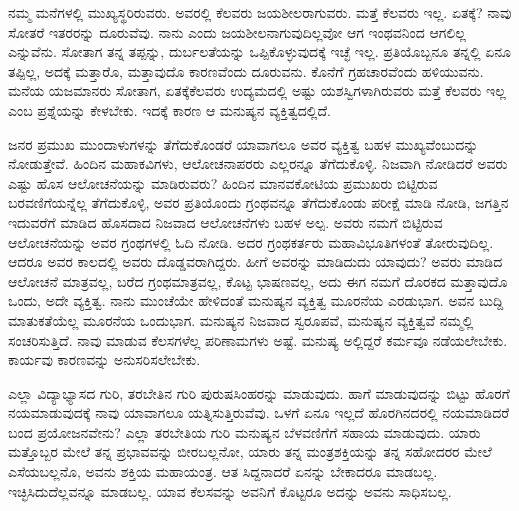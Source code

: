 ನಮ್ಮ ಮನೆಗಳಲ್ಲಿ ಮುಖ್ಯಸ್ಥರಿರುವರು. ಅವರಲ್ಲಿ ಕೆಲವರು ಜಯಶೀಲರಾಗುವರು. ಮತ್ತೆ ಕೆಲವರು ಇಲ್ಲ. ಏತಕ್ಕೆ? ನಾವು ಸೋತರೆ ಇತರರನ್ನು ದೂರುವೆವು. ನಾನು ಎಂದು ಜಯಶೀಲನಾಗುವುದಿಲ್ಲವೋ ಆಗ ಇಂಥವನಿಂದ ಆಗಲಿಲ್ಲ ಎನ್ನುವೆನು. ಸೋತಾಗ ತನ್ನ ತಪ್ಪನ್ನು, ದುರ್ಬಲತೆಯನ್ನು ಒಪ್ಪಿಕೊಳ್ಳುವುದಕ್ಕೆ ಇಚ್ಛೆ ಇಲ್ಲ. ಪ್ರತಿಯೊಬ್ಬನೂ ತನ್ನಲ್ಲಿ ಏನೂ ತಪ್ಪಿಲ್ಲ, ಅದಕ್ಕೆ ಮತ್ತಾರೊ, ಮತ್ತಾವುದೊ ಕಾರಣವೆಂದು ದೂರುವನು. ಕೊನೆಗೆ ಗ್ರಹಚಾರವೆಂದು ಹಳಿಯುವನು. ಮನೆಯ ಯಜಮಾನರು ಸೋತಾಗ, ಏತಕ್ಕೆ\break ಕೆಲವರು ಉದ್ಯಮದಲ್ಲಿ ಅಷ್ಟು ಯಶಸ್ವಿಗಳಾಗಿರುವರು ಮತ್ತೆ ಕೆಲವರು ಇಲ್ಲ ಎಂಬ ಪ್ರಶ್ನೆಯನ್ನು ಕೇಳಬೇಕು. ಇದಕ್ಕೆ ಕಾರಣ ಆ ಮನುಷ್ಯನ ವ್ಯಕ್ತಿತ್ವದಲ್ಲಿದೆ.

ಜನರ ಪ್ರಮುಖ ಮುಂದಾಳುಗಳನ್ನು ತೆಗೆದುಕೊಂಡರೆ ಯಾವಾಗಲೂ ಅವರ ವ್ಯಕ್ತಿತ್ವ ಬಹಳ ಮುಖ್ಯವೆಂಬುದನ್ನು ನೋಡುತ್ತೇವೆ. ಹಿಂದಿನ ಮಹಾಕವಿಗಳು, ಆಲೋಚನಾಪರರು ಎಲ್ಲರನ್ನೂ ತೆಗೆದುಕೊಳ್ಳಿ. ನಿಜವಾಗಿ ನೋಡಿದರೆ ಅವರು ಎಷ್ಟು ಹೊಸ ಆಲೋಚನೆಯನ್ನು ಮಾಡಿರುವರು? ಹಿಂದಿನ ಮಾನವಕೋಟಿಯ ಪ್ರಮುಖರು ಬಿಟ್ಟಿರುವ ಬರವಣಿಗೆಯನ್ನೆಲ್ಲ ತೆಗೆದುಕೊಳ್ಳಿ, ಅವರ ಪ್ರತಿಯೊಂದು ಗ್ರಂಥವನ್ನೂ ತೆಗೆದುಕೊಂಡು ಪರೀಕ್ಷೆ ಮಾಡಿ ನೋಡಿ, ಜಗತ್ತಿನ ಇದುವರೆಗೆ ಮಾಡಿದ ಹೊಸದಾದ ನಿಜವಾದ ಆಲೋಚನೆಗಳು ಬಹಳ ಅಲ್ಪ. ಅವರು ನಮಗೆ ಬಿಟ್ಟಿರುವ ಆಲೋಚನೆಯನ್ನು ಅವರ ಗ್ರಂಥಗಳಲ್ಲಿ ಓದಿ ನೋಡಿ. ಅದರ ಗ್ರಂಥಕರ್ತರು ಮಹಾವಿಭೂತಿಗಳಂತೆ ತೋರುವುದಿಲ್ಲ. ಆದರೂ ಅವರ ಕಾಲದಲ್ಲಿ ಅವರು ದೊಡ್ಡವರಾಗಿದ್ದರು. ಹೀಗೆ ಅವರನ್ನು ಮಾಡಿದುದು ಯಾವುದು? ಅವರು ಮಾಡಿದ ಆಲೋಚನೆ ಮಾತ್ರವಲ್ಲ, ಬರೆದ ಗ್ರಂಥಮಾತ್ರವಲ್ಲ, ಕೊಟ್ಟ ಭಾಷಣವಲ್ಲ, ಅದು ಈಗ ನಮಗೆ ದೊರಕದ ಮತ್ತಾವುದೊ ಒಂದು, ಅದೇ ವ್ಯಕ್ತಿತ್ವ. ನಾನು ಮುಂಚೆಯೇ ಹೇಳಿದಂತೆ ಮನುಷ್ಯನ ವ್ಯಕ್ತಿತ್ವ ಮೂರನೆಯ ಎರಡುಭಾಗ. ಅವನ ಬುದ್ದಿ ಮಾತುಕತೆಯೆಲ್ಲ ಮೂರನೆಯ ಒಂದುಭಾಗ. ಮನುಷ್ಯನ ನಿಜವಾದ ಸ್ವರೂಪವೆ, ಮನುಷ್ಯನ ವ್ಯಕ್ತಿತ್ವವೆ ನಮ್ಮಲ್ಲಿ ಸಂಚರಿಸುತ್ತಿದೆ. ನಾವು ಮಾಡುವ ಕೆಲಸಗಳೆಲ್ಲ ಪರಿಣಾಮಗಳು ಅಷ್ಟೆ. ಮನುಷ್ಯ ಅಲ್ಲಿದ್ದರೆ ಕರ್ಮವೂ ನಡೆಯಲೇಬೇಕು. ಕಾರ್ಯವು ಕಾರಣವನ್ನು ಅನುಸರಿಸಲೇಬೇಕು.

ಎಲ್ಲಾ ವಿದ್ಯಾಭ್ಯಾಸದ ಗುರಿ, ತರಬೇತಿನ ಗುರಿ ಪುರುಷಸಿಂಹರನ್ನು ಮಾಡುವುದು. ಹಾಗೆ ಮಾಡುವುದನ್ನು ಬಿಟ್ಟು ಹೊರಗೆ ನಯಮಾಡುವುದಕ್ಕೆ ನಾವು ಯಾವಾಗಲೂ ಯತ್ನಿಸುತ್ತಿರುವೆವು. ಒಳಗೆ ಏನೂ ಇಲ್ಲದೆ ಹೊರಗಿನದರಲ್ಲಿ ನಯಮಾಡಿದರೆ ಬಂದ ಪ್ರಯೋಜನವೇನು? ಎಲ್ಲಾ ತರಬೇತಿಯ ಗುರಿ ಮನುಷ್ಯನ ಬೆಳವಣಿಗೆಗೆ ಸಹಾಯ ಮಾಡುವುದು. ಯಾರು ಮತ್ತೊಬ್ಬರ ಮೇಲೆ ತನ್ನ ಪ್ರಭಾವವನ್ನು ಬೀರಬಲ್ಲನೋ, ಯಾರು ತನ್ನ ಮಂತ್ರಶಕ್ತಿಯನ್ನು ತನ್ನ ಸಹೋದರರ ಮೇಲೆ ಎಸೆಯಬಲ್ಲನೊ, ಅವನು ಶಕ್ತಿಯ ಮಹಾಯಂತ್ರ. ಆತ ಸಿದ್ದನಾದರೆ ಏನನ್ನು ಬೇಕಾದರೂ ಮಾಡಬಲ್ಲ. ಇಚ್ಛಿಸಿದುದೆಲ್ಲವನ್ನೂ ಮಾಡಬಲ್ಲ. ಯಾವ ಕೆಲಸವನ್ನು ಅವನಿಗೆ ಕೊಟ್ಟರೂ ಅದನ್ನು ಅವನು ಸಾಧಿಸಬಲ್ಲ.

